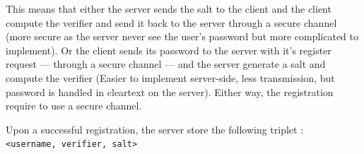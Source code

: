 \documentclass[../report.tex]{subfiles}
\begin{document}
This means that either the server sends the salt to the client and the client compute the verifier and send it back to the server through a secure channel (more secure as the server never see the user's password but more complicated to implement).
Or the client sends its password to the server with it's register request --- through a secure channel --- and the server generate a salt and compute the verifier (Easier to implement server-side, less transmission, but password is handled in cleartext on the server).
Either way, the registration require to use a secure channel.

Upon a successful registration, the server store the following triplet : \\
\verb|<username, verifier, salt>|











\end{document}
